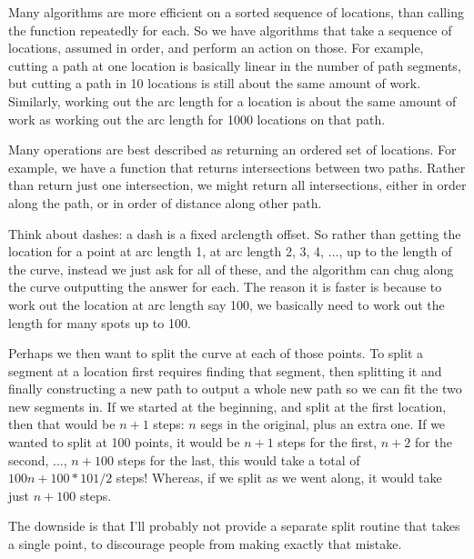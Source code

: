 \documentclass[openany]{book}
\begin{document}
Many algorithms are more efficient on a sorted sequence of locations,
than calling the function repeatedly for each.  So we have algorithms
that take a sequence of locations, assumed in order, and perform an
action on those.  For example, cutting a path at one location is
basically linear in the number of path segments, but cutting a path in
10 locations is still about the same amount of work.  Similarly,
working out the arc length for a location is about the same amount of
work as working out the arc length for 1000 locations on that path.

Many operations are best described as returning an ordered set of
locations.  For example, we have a function that returns
intersections between two paths.  Rather than return just one
intersection, we might return all intersections, either in order along
the path, or in order of distance along other path.

Think about dashes: a dash is a fixed arclength offset.  So rather
than getting the location for a point at arc length 1, at arc length
2, 3, 4, $\ldots$, up to the length of the curve, instead we just ask for all of
these, and the algorithm can chug along the curve outputting the
answer for each.  The reason it is faster is because to work out the
location at arc length say 100, we basically need to work out the
length for many spots up to 100.

Perhaps we then want to split the curve at each of those points.  To
split a segment at a location first requires finding that segment,
then splitting it and finally constructing a new path to output a whole
new path so we can fit the two new segments in.  If we started at the
beginning, and split at the first location, then that would be $n+1$ steps: $n$
segs in the original, plus an extra one.  If we wanted to split at 100
points, it would be $n+1$ steps for the first, $n+2$ for the
second, $\ldots$, $n+100$ steps for the last, this would take a total of $100n +
100*101/2$ steps!  Whereas, if we split as we went along, it would take
just $n+100$ steps.

The downside is that I'll probably not provide a separate split
routine that takes a single point, to discourage people from making
exactly that mistake.

\label{chapter:bibliography}
\end{document}
